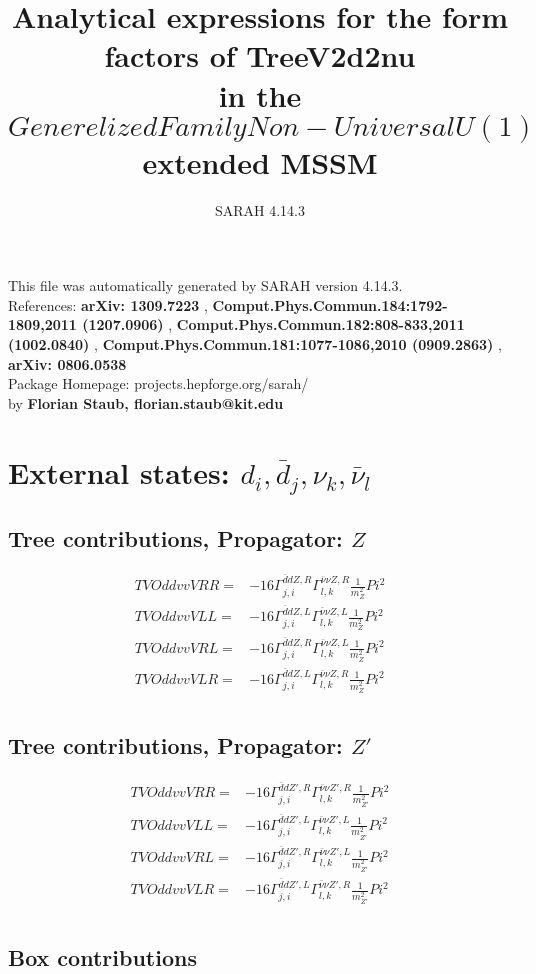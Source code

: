 \documentclass[A4,landscape]{article}
\begin{document}
\title{Analytical expressions for the form factors of TreeV2d2nu\\ in the $Generelized Family Non-Universal U(1)$ extended MSSM } 
 \author{SARAH 4.14.3} 
 \maketitle 
 \vspace{10cm} 
This file was automatically generated by SARAH version 4.14.3.  \\ 
References: {\bf arXiv: 1309.7223 }, {\bf Comput.Phys.Commun.184:1792-1809,2011 (1207.0906) }, {\bf Comput.Phys.Commun.182:808-833,2011 (1002.0840) }, {\bf Comput.Phys.Commun.181:1077-1086,2010 (0909.2863) }, {\bf arXiv: 0806.0538 } \\ 
Package Homepage: projects.hepforge.org/sarah/ \\ 
by {\bf Florian Staub, florian.staub@kit.edu} 
 \pagebreak 
 \tableofcontents 
 \pagebreak 
\section{External states: ${d_{{i}}, \bar{d}_{{j}}, \nu_{{k}}, \bar{\nu}_{{l}}}$} 
\subsection{Tree contributions, Propagator: $Z$} 

\begin{align} 
  TVOddvvVRR= & -16 \Gamma^{\bar{d}d Z ,R}_{j, i} \Gamma^{\bar{\nu}\nu Z ,R}_{l, k} \frac{1}{m^2_{Z}} Pi^2 \\ 
  TVOddvvVLL= & -16 \Gamma^{\bar{d}d Z ,L}_{j, i} \Gamma^{\bar{\nu}\nu Z ,L}_{l, k} \frac{1}{m^2_{Z}} Pi^2 \\ 
  TVOddvvVRL= & -16 \Gamma^{\bar{d}d Z ,R}_{j, i} \Gamma^{\bar{\nu}\nu Z ,L}_{l, k} \frac{1}{m^2_{Z}} Pi^2 \\ 
  TVOddvvVLR= & -16 \Gamma^{\bar{d}d Z ,L}_{j, i} \Gamma^{\bar{\nu}\nu Z ,R}_{l, k} \frac{1}{m^2_{Z}} Pi^2 \\ 
\end{align} 
\subsection{Tree contributions, Propagator: ${Z'}$} 

\begin{align} 
  TVOddvvVRR= & -16 \Gamma^{\bar{d}d {Z'} ,R}_{j, i} \Gamma^{\bar{\nu}\nu {Z'} ,R}_{l, k} \frac{1}{m^2_{{Z'}}} Pi^2 \\ 
  TVOddvvVLL= & -16 \Gamma^{\bar{d}d {Z'} ,L}_{j, i} \Gamma^{\bar{\nu}\nu {Z'} ,L}_{l, k} \frac{1}{m^2_{{Z'}}} Pi^2 \\ 
  TVOddvvVRL= & -16 \Gamma^{\bar{d}d {Z'} ,R}_{j, i} \Gamma^{\bar{\nu}\nu {Z'} ,L}_{l, k} \frac{1}{m^2_{{Z'}}} Pi^2 \\ 
  TVOddvvVLR= & -16 \Gamma^{\bar{d}d {Z'} ,L}_{j, i} \Gamma^{\bar{\nu}\nu {Z'} ,R}_{l, k} \frac{1}{m^2_{{Z'}}} Pi^2 \\ 
\end{align} 
\subsection{Box contributions} 
\end{document}

